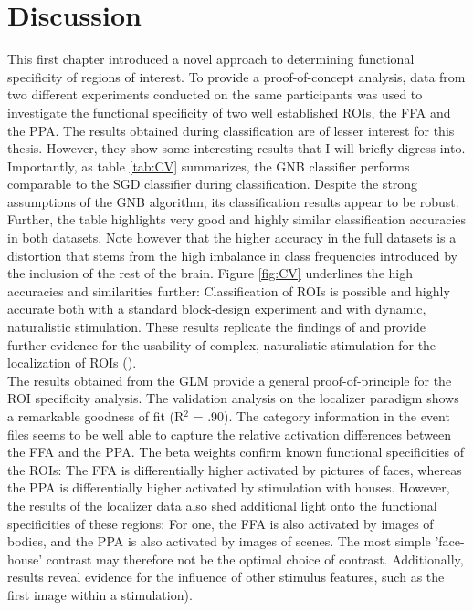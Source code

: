 \documentclass[a4paper, 12pt]{scrreprt}
\begin{document}
\section{Discussion}\label{sec:c1_discussion}

This first chapter introduced a novel approach to determining functional specificity of regions of interest. To provide a proof-of-concept analysis, data from two different experiments conducted on the same participants was used to investigate the functional specificity of two well established ROIs, the FFA and the PPA. \newline
The results obtained during classification are of lesser interest for this thesis. However, they show some interesting results that I will briefly digress into. Importantly, as table \ref{tab:CV} summarizes, the GNB classifier performs comparable to the SGD classifier during classification. Despite the strong assumptions of the GNB algorithm, its classification results appear to be robust. Further, the table highlights very good and highly similar classification accuracies in both datasets. Note however that the higher accuracy in the full datasets is a distortion that stems from the high imbalance in class frequencies introduced by the inclusion of the rest of the brain. \newline Figure \ref{fig:CV} underlines the high accuracies and similarities further: Classification of ROIs is possible and highly accurate both with a standard block-design experiment and with dynamic, naturalistic stimulation. These results replicate the findings of \textcite{nastase2016} and provide further evidence for the usability of complex, naturalistic stimulation for the localization of ROIs (\cite{malinen2007towards}).\\
The results obtained from the GLM provide a general proof-of-principle for the ROI specificity analysis. The validation analysis on the localizer paradigm shows a remarkable goodness of fit (R$^2$ = .90). The category information in the event files seems to be well able to capture the relative activation differences between the FFA and the PPA. The beta weights confirm known functional specificities of the ROIs: The FFA is differentially higher activated by pictures of faces, whereas the PPA is differentially higher activated by stimulation with houses. However, the results of the localizer data also shed additional light onto the functional specificities of these regions: For one, the FFA is also activated by images of bodies, and the PPA is also activated by images of scenes. The most simple 'face-house' contrast may therefore not be the optimal choice of contrast. Additionally, results reveal evidence for the influence of other stimulus features, such as the first image within a stimulation). \newline
\end{document}

